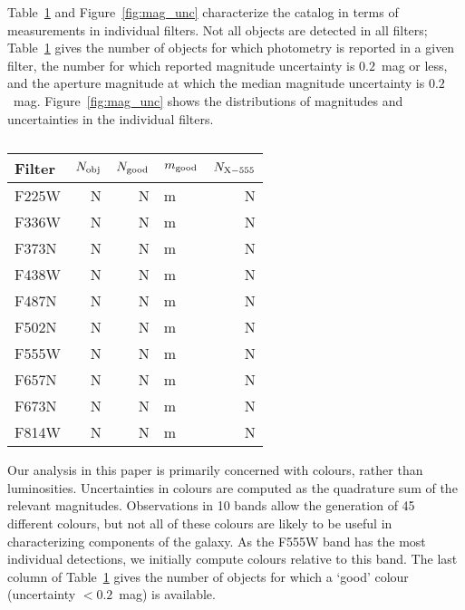Table~\ref{tab:cat_numbers} and Figure~\ref{fig:mag_unc} characterize the catalog in terms of measurements in individual filters.
Not all objects are detected in all filters;
Table~\ref{tab:cat_numbers} gives the number of objects for which photometry is reported in a given filter,
the number for which reported magnitude uncertainty is $0.2$~mag or less,
and the aperture magnitude at which the median magnitude uncertainty is $0.2$~mag. 
Figure~\ref{fig:mag_unc} shows the distributions of magnitudes and uncertainties in the individual filters.

\begin{table}
\centering
\caption{
\label{tab:cat_numbers}}
\begin{tabular}{lrrlr}
\hline\hline
Filter & $N_{\rm obj}$ & $N_{\rm good}$ & $m_{\rm good}$ & $N_{\rm X-555}$\\
\hline
F225W &  N & N & m & N\\
F336W &  N & N & m & N\\
F373N &  N & N & m & N\\
F438W &  N & N & m & N\\
F487N &  N & N & m & N\\
F502N &  N & N & m & N\\
F555W &  N & N & m & N\\
F657N &  N & N & m & N\\
F673N &  N & N & m & N\\
F814W &  N & N & m & N\\
\hline
\end{tabular}
\end{table}

\begin{figure*}
\centering
\caption{Distribution of magnitudes and uncertainties for objects in the \citet{chandar10} M83 ERS catalog.}
\label{fig:mag_unc}
\end{figure*}

Our analysis in this paper is primarily concerned with colours, rather than luminosities.
Uncertainties in colours are computed as the quadrature sum of the relevant magnitudes.
Observations in 10 bands allow the generation of 45 different colours,
but not all of these colours are likely to be useful in characterizing components of the galaxy.
As the F555W band has the most individual detections, %
we initially compute colours relative to this band.
The last column of Table~\ref{tab:cat_numbers} gives the number of objects for which a `good' colour (uncertainty $<0.2$~mag) is available.



